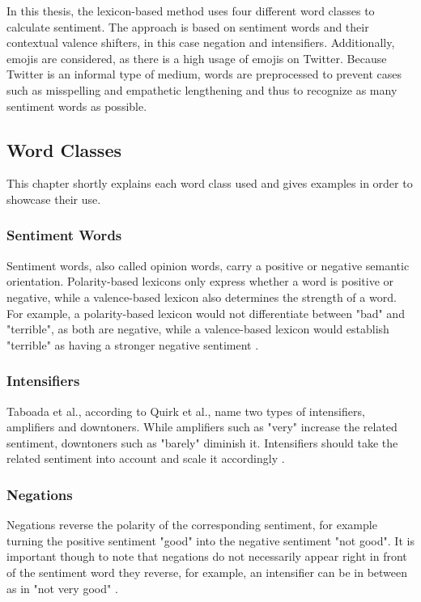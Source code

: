In this thesis, the lexicon-based method uses four different word classes to calculate sentiment. The approach is based on sentiment words and their contextual valence shifters, in this case negation and intensifiers. Additionally, emojis are considered, as there is a high usage of emojis on Twitter. Because Twitter is an informal type of medium, words are preprocessed to prevent cases such as misspelling and empathetic lengthening and thus to recognize as many sentiment words as possible.

\subsection{Word Classes}
This chapter shortly explains each word class used and gives examples in order to showcase their use.

\subsubsection{Sentiment Words}
Sentiment words, also called opinion words, carry a positive or negative semantic orientation. Polarity-based lexicons only express whether a word is positive or negative, while a valence-based lexicon also determines the strength of a word. For example, a polarity-based lexicon would not differentiate between "bad" and "terrible", as both are negative, while a valence-based lexicon would establish "terrible" as having a stronger negative sentiment \cite{DBLP:conf/icwsm/HuttoG14}.

\subsubsection{Intensifiers}
Taboada et al., according to Quirk et al., name two types of intensifiers, amplifiers and downtoners. While amplifiers such as "very" increase the related sentiment, downtoners such as "barely" diminish it. Intensifiers should take the related sentiment into account and scale it accordingly \cite{taboada}.

\subsubsection{Negations}
Negations reverse the polarity of the corresponding sentiment, for example turning the positive sentiment "good" into the negative sentiment "not good". It is important though to note that negations do not necessarily appear right in front of the sentiment word they reverse, for example, an intensifier can be in between as in "not very good" \cite{taboada}.

